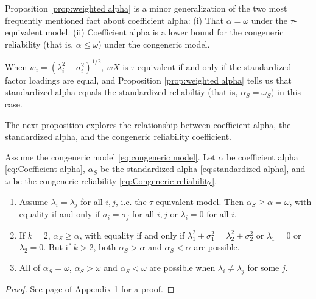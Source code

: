 \documentclass[twoside]{article}
\renewcommand{\sqrt}[1]{{(#1)^{1/2}}}
\begin{document}

Proposition \ref{prop:weighted alpha} is a minor generalization of the two most frequently mentioned fact about coefficient alpha: (i) That $\alpha = \omega$ under the $\tau$-equivalent model. (ii) Coefficient alpha is a lower bound for the congeneric reliability (that is, $\alpha \leq \omega$) under the congeneric model.
 
When $w_{i}=\sqrt{\lambda_{i}^{2}+\sigma_{i}^{2}}$, $wX$ is $\tau$-equivalent if and only if the standardized factor loadings are equal, and Proposition \ref{prop:weighted alpha} tells us that standardized alpha equals the standardized reliabiltiy (that is, $\alpha_S = \omega_S$) in this case. 

The next proposition explores the relationship between coefficient alpha, the standardized alpha, and the congeneric reliability coefficient.

\begin{prop}
\label{prop:Reliabilities.}Assume the congeneric model \eqref{eq:congeneric model}. Let $\alpha$ be coefficient alpha \eqref{eq:Coefficient alpha}, $\alpha_S$ be the standardized alpha \eqref{eq:standardized alpha}, and  $\omega$ be the congeneric reliability \eqref{eq:Congeneric reliability}. 
\begin{enumerate}[label=(\roman*)]
\item Assume $\lambda_{i}=\lambda_{j}$ for all $i,j$, i.e. the $\tau$-equivalent model. Then $\alpha_S \geq \alpha = \omega$, with equality if and only if $\sigma_{i}=\sigma_{j}$ for all $i,j$ or $\lambda_i = 0$ for all $i$.
\item If $k=2$, $\alpha_S\geq\alpha$, with equality if and only if $\lambda_{1}^{2}+\sigma_{1}^{2}=\lambda_{2}^{2}+\sigma_{2}^{2}$ or $\lambda_1 = 0$ or $\lambda_2 = 0$. But if $k>2$, both $\alpha_S>\alpha$
and $\alpha_S<\alpha$ are possible.
\item All of $\alpha_S=\omega$, $\alpha_S>\omega$ and $\alpha_S<\omega$
are possible when $\lambda_{i}\neq\lambda_{j}$ for some $j$.
\end{enumerate}
\end{prop}
\begin{proof}
See page \pageref{proof:Reliabilities.} of Appendix 1 for a proof.
\end{proof}
\end{document}
